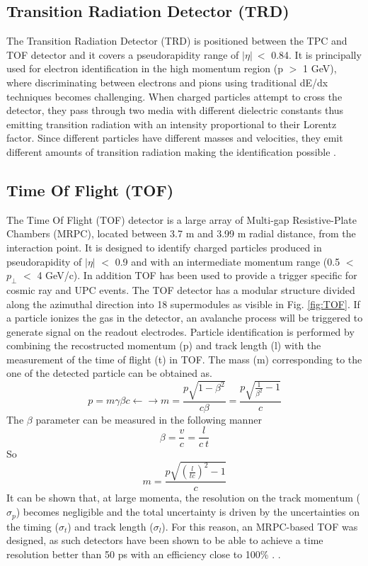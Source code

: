 \documentclass[12pt,a4paper]{book}
\begin{document}
	
	\subsection{Transition Radiation Detector (TRD)}
	The Transition Radiation Detector (TRD) is positioned between the TPC and TOF detector and it covers a pseudorapidity range of $|\eta|\ <$ 0.84. It is principally used for electron identification in the high momentum region (p $>$ 1 GeV), where discriminating between electrons and pions using traditional dE/dx techniques becomes challenging. When charged particles attempt to cross the detector, they pass through two media with different dielectric constants thus emitting transition radiation with an intensity proportional to their Lorentz factor. Since different particles have different masses and velocities, they emit different amounts of transition radiation making the identification possible
	\cite{Padhan:2924203} \cite{amsdottorato9036}.
	
	
	\subsection{Time Of Flight (TOF)}
	The Time Of Flight (TOF) detector is a large array of Multi-gap Resistive-Plate Chambers (MRPC), located between 3.7 m and 3.99 m radial distance, from the interaction point. It is designed to identify charged particles produced in pseudorapidity of $|\eta|$ $<$ 0.9 and with an intermediate momentum range (0.5 $<$ $p_\perp$ $<$ 4 GeV/c). In addition TOF has been used to provide a trigger specific for cosmic ray and UPC events. The TOF detector has a modular structure divided along the azimuthal direction into 18 supermodules as visible in Fig. \ref{fig:TOF}. If a particle ionizes the gas in the detector, an avalanche process will be triggered to generate signal on the readout electrodes. Particle identification is performed by combining the recostructed momentum (p) and track length (l) with the measurement of the time of flight (t) in TOF. The mass (m) corresponding to the one of the detected particle can be obtained as. 
	\begin{equation}
		p = m \gamma \beta c \leftarrow \rightarrow m = \frac{p \sqrt{1- \beta^2}}{c \beta} = \frac{p \sqrt{\frac{1}{\beta^2}-1}}{c}
	\end{equation} 
	The $\beta$ parameter can be measured in the following manner
	\begin{equation}
		\beta = \frac{v}{c}=\frac{l}{c \ t}
	\end{equation}
	So 
	\begin{equation}
		m = \frac{p \sqrt{\left( \frac{l}{t c} \right)^2-1}}{c}
	\end{equation}
	It can be shown that, at large momenta, the resolution on the track momentum ($\sigma_p$) becomes negligible and the total uncertainty is driven by the uncertainties on the timing ($\sigma_t$) and track length ($\sigma_l$). For this reason, an MRPC-based TOF was designed, as such detectors have been shown to be able to achieve a time resolution better than 50 ps with an efficiency close to 100\% 
	\cite{Padhan:2924203} \cite{amsdottorato9036} \cite{Cheng:2908766}. .
	
\end{document}
